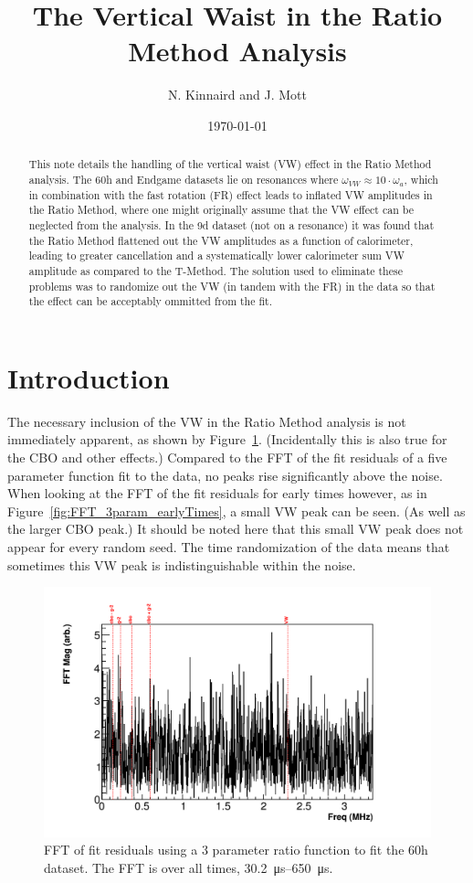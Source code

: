 \documentclass[12pt,letterpaper]{article}
\title{The Vertical Waist in the Ratio Method Analysis}
\author{N. Kinnaird and J. Mott}
\date{\today}
\newcommand{\figref}[1]{Figure~\ref{#1}}
\begin{document}
\maketitle

\begin{abstract}
This note details the handling of the vertical waist (VW) effect in the Ratio Method analysis. The 60h and Endgame datasets lie on resonances where $\omega_{VW} \approx 10 \cdot \omega_{a}$, which in combination with the fast rotation (FR) effect leads to inflated VW amplitudes in the Ratio Method, where one might originally assume that the VW effect can be neglected from the analysis. In the 9d dataset (not on a resonance) it was found that the Ratio Method flattened out the VW amplitudes as a function of calorimeter, leading to greater cancellation and a systematically lower calorimeter sum VW amplitude as compared to the T-Method. The solution used to eliminate these problems was to randomize out the VW (in tandem with the FR) in the data so that the effect can be acceptably ommitted from the fit.
\end{abstract}


\section{Introduction}

The necessary inclusion of the VW in the Ratio Method analysis is not immediately apparent, as shown by \figref{fig:FFT_3param_allTimes}. (Incidentally this is also true for the CBO and other effects.) Compared to the FFT of the fit residuals of a five parameter function fit to the data, no peaks rise significantly above the noise. When looking at the FFT of the fit residuals for early times however, as in \figref{fig:FFT_3param_earlyTimes}, a small VW peak can be seen. (As well as the larger CBO peak.) It should be noted here that this small VW peak does not appear for every random seed. The time randomization of the data means that sometimes this VW peak is indistinguishable within the noise. 


\begin{figure}[]
    \centering
    \includegraphics[width=.8\textwidth]{FFT_3param_allTimes}
    \caption[]{FFT of fit residuals using a 3 parameter ratio function to fit the 60h dataset. The FFT is over all times, \SIrange{30.2}{650}{\micro s}.}
    \label{fig:FFT_3param_allTimes}
\end{figure}
\end{document}
